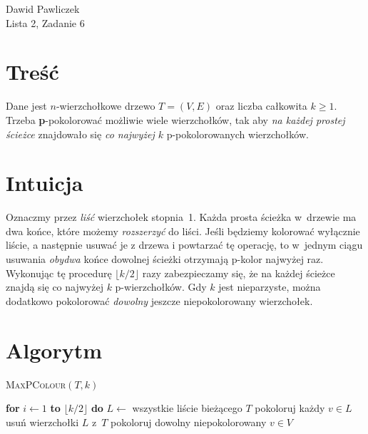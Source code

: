 \documentclass[11pt,a4paper]{article}
\begin{document}
\begin{center}
\Large Dawid Pawliczek\\
Lista 2, Zadanie 6
\end{center}

\bigskip
\section*{Treść}

Dane jest $n$-wierzchołkowe drzewo $T=(V,E)$
oraz liczba całkowita $k\ge1$.
Trzeba  \textbf{p}-pokolorować możliwie wiele wierzchołków,
tak aby \emph{na każdej prostej ścieżce} znajdowało się
\emph{co najwyżej $k$} p-pokolorowanych wierzchołków.

\section*{Intuicja}

Oznaczmy przez \emph{liść} wierzchołek stopnia~1.
Każda prosta ścieżka w~drzewie ma dwa końce,
które możemy \emph{rozszerzyć} do liści.
Jeśli będziemy kolorować wyłącznie liście,
a następnie usuwać je z drzewa i
powtarzać tę operację,  
to w~jednym ciągu usuwania
\emph{obydwa} końce dowolnej ścieżki
otrzymają p-kolor najwyżej raz.
Wykonując tę procedurę
\(
  \lfloor k/2\rfloor
\)
razy
zabezpieczamy się,
że na każdej ścieżce znajdą się co najwyżej
$k$ p-wierzchołków.
Gdy $k$ jest nieparzyste,
można dodatkowo pokolorować
\emph{dowolny} jeszcze niepokolorowany wierzchołek.

\section*{Algorytm}

\begin{algorithm}[H]
\caption{\textsc{MaxPColour}$(T,k)$}
\begin{algorithmic}[1]
\State \textbf{for} $i\gets1$ \textbf{to} $\lfloor k/2\rfloor$ \textbf{do}
   \State\hspace{1em} $L\gets$ wszystkie liście bieżącego $T$
   \State\hspace{1em} pokoloruj każdy $v\in L$
   \State\hspace{1em} usuń wierzchołki $L$ z~$T$
   \State pokoloruj dowolny niepokolorowany $v\in V$
\EndIf
\State {}
\end{algorithmic}
\end{algorithm}
\end{document}
